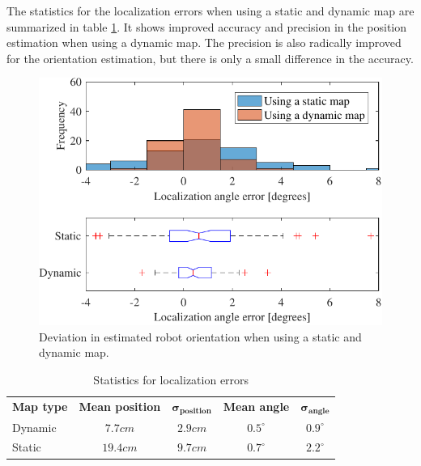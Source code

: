 The statistics for the localization errors when using a static and dynamic map are summarized in table \ref{tab:localization_errors}. It shows improved accuracy and precision in the position estimation when using a dynamic map. The precision is also radically improved for the orientation estimation, but there is only a small difference in the accuracy.
\begin{figure}
    \centering
    \includegraphics[scale=1]{chapters/evaluation/figures/localization_angle_error-crop}
    \caption{Deviation in estimated robot orientation when using a static and dynamic map.}
    \label{fig:precision_test_angles}
\end{figure}

\begin{table}[htbp]
    \caption{Statistics for localization errors}
    \label{tab:localization_errors}
    \begin{center}
        \begin{tabular}{l c  c  c  c}
            \toprule
            \textbf{Map type} & \textbf{Mean position} & $\boldsymbol{\sigma_{position}}$  & \textbf{Mean angle} & $\boldsymbol{\sigma_{angle}}$\\ 
            \rowcolor[gray]{0.925}
            Dynamic & $7.7cm$ & $2.9cm$ & $0.5^\circ$ & $0.9^\circ$  \\ 
            Static & $19.4cm$ & $9.7cm$ & $0.7^\circ$ & $2.2^\circ$  \\ 	
            \bottomrule
        \end{tabular} 
    \end{center}
\end{table}